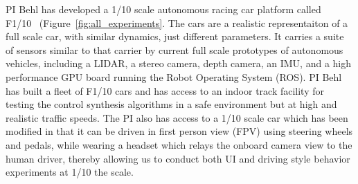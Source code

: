PI Behl has developed a 1/10 scale autonomous racing car platform called F1/10~\cite{f1tenth} (Figure~\ref{fig:all_experiments}. The cars are a realistic representaiton of a full scale car, with similar dynamics, just different parameters. It carries a suite of sensors similar to that carrier by current full scale prototypes of autonomous vehicles, including a LIDAR, a stereo camera, depth camera, an IMU, and a high performance GPU board running the Robot Operating System (ROS).
PI Behl has built a fleet of F1/10 cars and has access to an indoor track facility for testing the control synthesis algorithms in a safe environment but at high and realistic traffic speeds. The PI also has access to a 1/10 scale car which has been modified in that it can be driven in first person view (FPV) using steering wheels and pedals, while wearing a headset which relays the onboard camera view to the human driver, thereby allowing us to conduct both UI and driving style behavior experiments at 1/10 the scale.



